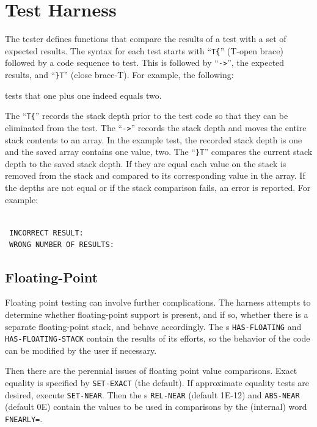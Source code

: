 \section{Test Harness}
\label{test:harness}

The tester defines functions that compare the results of a test with
a set of expected results.  The syntax for each test starts with
``\texttt{T\{}'' (T-open brace) followed by a code sequence to test.
This is followed by ``\texttt{->}'', the expected results, and
``\texttt{\}T}'' (close brace-T).  For example, the following:

\begin{quote}
\end{quote}

tests that one plus one indeed equals two.

The ``\texttt{T\{}'' records the stack depth prior to the test code
so that they can be eliminated from the test.
The ``\texttt{->}'' records the stack depth and moves the entire stack
contents to an array.  In the example test, the recorded stack depth
is one and the saved array contains one value, two.
The ``\texttt{\}T}'' compares the current stack depth to the saved
stack depth.  If they are equal each value on the stack is removed
from the stack and compared to its corresponding value in the array.
If the depths are not equal or if the stack comparison fails, an error
is reported.  For example:

 \\
\ \texttt{INCORRECT RESULT:}  \\
\   \texttt{WRONG NUMBER OF RESULTS:}  \\

\subsection{Floating-Point}

Floating point testing can involve further complications.  The harness
attempts to determine whether floating-point support is present, and
if so, whether there is a separate floating-point stack, and behave
accordingly.  The s \texttt{HAS-FLOATING} and
\texttt{HAS-FLOATING-STACK} contain the results of its efforts, so
the behavior of the code can be modified by the user if necessary.

Then there are the perennial issues of floating point value
comparisons.  Exact equality is specified by \texttt{SET-EXACT}
(the default).  If approximate equality tests are desired, execute
\texttt{SET-NEAR}.  Then the \linebreak
{}s \texttt{REL-NEAR} (default 1E-12) and
\texttt{ABS-NEAR} (default 0E) contain the values to be used in
comparisons by the (internal) word \texttt{FNEARLY=}.

